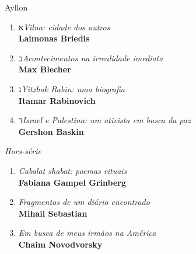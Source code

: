 \pagebreak
\pagestyle{empty}

\begingroup
\fontsize{7}{8}%

\newfontfamily{}

\formular

\scriptsize
{\Large Ayllon}
\smallskip
\begin{enumerate}
\setlength\parskip{4.2pt}
\setlength\itemsep{-1.4mm}
\item {\selectfont\arial\normalsize א}\quad \textit{Vilna: cidade dos outros}\\ \textbf{Laimonas Briedis}
\setlength\parskip{8pt}
\item {\selectfont\arial\normalsize ב}\quad \textit{Acontecimentos na irrealidade imediata}\\ \textbf{Max Blecher}
\item {\selectfont\arial\normalsize ג}\quad \textit{Yitzhak Rabin: uma biografia}\\ \textbf{Itamar Rabinovich}
\item {\selectfont\arial\normalsize ד}\quad \textit{Israel e Palestina: um ativista em busca da paz}\\ \textbf{Gershon Baskin}
\end{enumerate}

\bigskip

\scriptsize
{\Large \textit{Hors-série}}
\smallskip
\begin{enumerate}
\setlength\parskip{4.2pt}
\setlength\itemsep{-1.4mm}
\item \textit{Cabalat shabat: poemas rituais}\\ \textbf{Fabiana Gampel Grinberg}
\setlength\parskip{8pt}
\item \textit{Fragmentos de um diário encontrado}\\ \textbf{Mihail Sebastian}
\setlength\parskip{8pt}
\item \textit{Em busca de meus irmãos na América}\\ \textbf{Chaim Novodvorsky}
\end{enumerate}

\pagebreak

